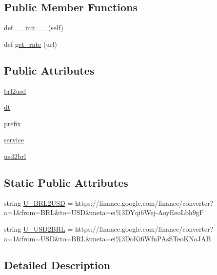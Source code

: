 \subsection*{Public Member Functions}
\begin{DoxyCompactItemize}
\item 
def \hyperlink{classrates_1_1_google_a6d9d023db3b4f6f2b585397e3469c396}{\+\_\+\+\_\+init\+\_\+\+\_\+} (self)
\item 
def \hyperlink{classrates_1_1_google_afa49252959b89741449dca773f2141b8}{get\+\_\+rate} (url)
\end{DoxyCompactItemize}
\subsection*{Public Attributes}
\begin{DoxyCompactItemize}
\item 
\hyperlink{classrates_1_1_google_a0979ffcb18b8bf3156cc5735c67ca6df}{brl2usd}
\item 
\hyperlink{classrates_1_1_google_a76574be36237f78780f76bed53e69ab2}{dt}
\item 
\hyperlink{classrates_1_1_google_ada5de8700ad571d0ab819fa0163d6bbe}{prefix}
\item 
\hyperlink{classrates_1_1_google_a1da08e36d5007aa5293d048b625a35e9}{service}
\item 
\hyperlink{classrates_1_1_google_a94c28f6d60d5d6afc075416d7378471c}{usd2brl}
\end{DoxyCompactItemize}
\subsection*{Static Public Attributes}
\begin{DoxyCompactItemize}
\item 
string \hyperlink{classrates_1_1_google_a46dbc3fa0a110bf5b66808c29642cfa1}{U\+\_\+\+B\+R\+L2\+U\+SD} = \textquotesingle{}https\+://finance.\+google.\+com/finance/converter?a=1\&from=B\+RL\&to=U\+SD\&meta=ei\%3\+D\+Yqi6\+Wej-\/\+Aoy\+Eeo\+Lbh9g\+F\textquotesingle{}
\item 
string \hyperlink{classrates_1_1_google_a77ef7f5932c48b002697fb187a234d4a}{U\+\_\+\+U\+S\+D2\+B\+RL} = \textquotesingle{}https\+://finance.\+google.\+com/finance/converter?a=1\&from=U\+SD\&to=B\+RL\&meta=ei\%3\+Do\+Ki6\+Wfn\+P\+As\+S\+Teo\+K\+No\+J\+A\+B\textquotesingle{}
\end{DoxyCompactItemize}


\subsection{Detailed Description}


